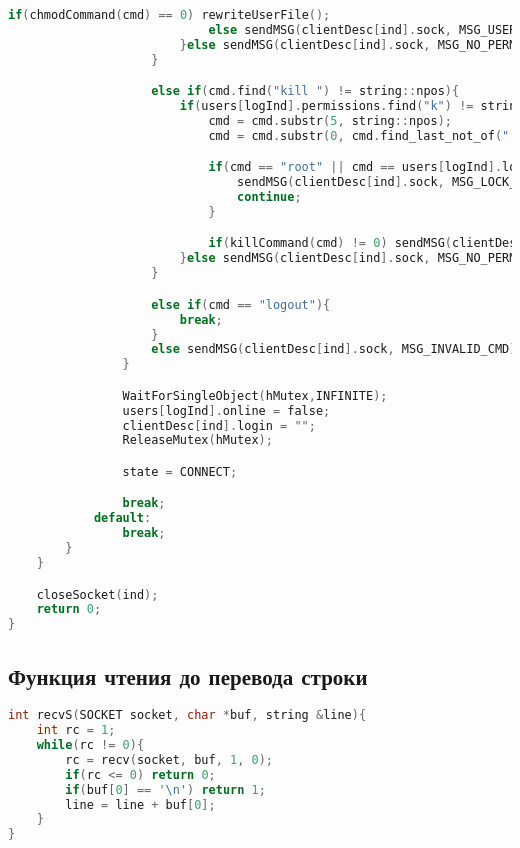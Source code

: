 \begin{append}
\begin{lstlisting}[language=C, label=lst:createserver]
                            if(chmodCommand(cmd) == 0) rewriteUserFile();
                            else sendMSG(clientDesc[ind].sock, MSG_USER_NOT_EXISTS);
                        }else sendMSG(clientDesc[ind].sock, MSG_NO_PERMISSIONS);
                    }

                    else if(cmd.find("kill ") != string::npos){
                        if(users[logInd].permissions.find("k") != string::npos){
                            cmd = cmd.substr(5, string::npos);
                            cmd = cmd.substr(0, cmd.find_last_not_of(" ") + 1);

                            if(cmd == "root" || cmd == users[logInd].login){
                                sendMSG(clientDesc[ind].sock, MSG_LOCK_KILL);
                                continue;
                            }

                            if(killCommand(cmd) != 0) sendMSG(clientDesc[ind].sock, MSG_KILL_FAILED);
                        }else sendMSG(clientDesc[ind].sock, MSG_NO_PERMISSIONS);
                    }

                    else if(cmd == "logout"){
                        break;
                    }
                    else sendMSG(clientDesc[ind].sock, MSG_INVALID_CMD);
                }

                WaitForSingleObject(hMutex,INFINITE);
                users[logInd].online = false;
                clientDesc[ind].login = "";
                ReleaseMutex(hMutex);

                state = CONNECT;

                break;
            default:
                break;
        }
    }

    closeSocket(ind);
    return 0;
}
\end{lstlisting}

\subsection{Функция чтения до перевода строки} \label{app:recvs}

\begin{lstlisting}[language=C, label=lst:createserver]
int recvS(SOCKET socket, char *buf, string &line){
    int rc = 1;
    while(rc != 0){
        rc = recv(socket, buf, 1, 0);
        if(rc <= 0) return 0;
        if(buf[0] == '\n') return 1;
        line = line + buf[0];
    }
}
\end{lstlisting}


\end{append}
